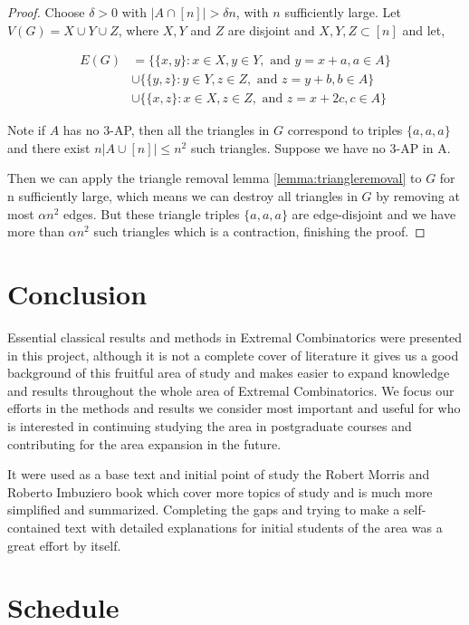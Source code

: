 \documentclass[12pt,twoside,a4paper]{book}
\numberwithin{equation}{section}
\theoremstyle{remark}
\begin{document}
\begin{proof}
Choose $\delta > 0$ with $|A \cap [n]| > \delta n$, with $n$ sufficiently large. Let $V(G) = X\cup Y \cup Z$, where $X, Y$ and $Z$ are disjoint and $X,Y,Z \subset [n]$ and let,

\begin{align*}
E(G) &= \{\{x,y\}\colon x \in X, y \in Y,\text{ and } y = x + a, a \in A\} \\
& \cup \{\{y,z\} \colon y \in Y, z \in Z, \text{ and } z = y + b, b \in A\}\\
& \cup \{\{x,z\} \colon x \in X, z \in Z, \text{ and } z = x +2c, c\in A\}
\end{align*}

Note if $A$ has no $3$-AP, then all the triangles in $G$ correspond to triples $\{a,a,a\}$ and there exist $n|A\cup [n]| \leq n^2$ such triangles. Suppose we have no $3$-AP in A.
 
 Then we can apply the triangle removal lemma \ref{lemma:triangleremoval} to $G$ for n sufficiently large, which means we can destroy all triangles in $G$ by removing at most $\alpha n^2$ edges. But these triangle triples $\{a,a,a\}$ are edge-disjoint and we have more than $\alpha n^2 $ such triangles which is a contraction, finishing the proof.
 
\end{proof}

\chapter{Conclusion}
Essential classical results and methods in Extremal Combinatorics were presented in this project, although it is not a complete cover of literature it gives us a good background of this fruitful area of study and makes easier to expand knowledge and results throughout the whole area of Extremal Combinatorics. We focus our efforts in the methods and results we consider most important and useful for who is interested in continuing studying the area in postgraduate courses and contributing for the area expansion in the future.

It were used as a base text and initial point of study the Robert Morris and Roberto Imbuziero book \cite{RoRo11} which cover more topics of study and is much more simplified and	 summarized. Completing the gaps and trying to make a self-contained text with detailed explanations for initial students of the area was a great effort by itself.

\chapter{Schedule}
\end{document}
